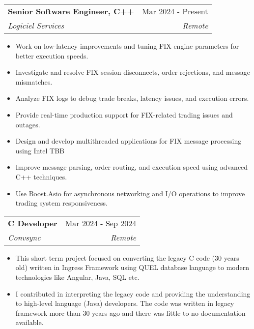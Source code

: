 \documentclass[letterpaper,11pt]{article}
\makeatletter
\newcommand{\resumeItem}[1]{
  \item\small{
    {#1 \vspace{-2pt}}
  }
}
\newcommand{\resumeSubheading}[4]{
  \vspace{-2pt}\item
    \begin{tabular*}{0.97\textwidth}[t]{l@{\extracolsep{\fill}}r}
      \textbf{#1} & #2 \\
      \textit{\small#3} & \textit{\small #4} \\
    \end{tabular*}\vspace{-7pt}
}
\newcommand{\resumeItemListStart}{\begin{itemize}}
\newcommand{\resumeItemListEnd}{\end{itemize}\vspace{-5pt}}
\makeatother
\begin{document}
    \resumeSubheading
      {Senior Software Engineer, C++}  {Mar 2024 - Present}
      {Logiciel Services}{Remote}
      \resumeItemListStart
        \resumeItem{Work on low-latency improvements and tuning FIX engine parameters for better execution speeds.}
        \resumeItem{Investigate and resolve FIX session disconnects, order rejections, and message mismatches.}
        \resumeItem{Analyze FIX logs to debug trade breaks, latency issues, and execution errors.}
        \resumeItem{Provide real-time production support for FIX-related trading issues and outages.}
        \resumeItem{Design and develop multithreaded applications for FIX message processing using Intel TBB}
        \resumeItem{Improve message parsing, order routing, and execution speed using advanced C++ techniques.}
        \resumeItem{Use Boost.Asio for asynchronous networking and I/O operations to improve trading system responsiveness.}
		\resumeItemListEnd
        \resumeSubheading
      {C Developer}  {Mar 2024 - Sep 2024}
      {Convsync}{Remote}
      \resumeItemListStart
        \resumeItem{This short term project focused on converting the legacy C code (30 years old) written in Ingress Framework using QUEL database language to modern technologies like Angular, Java, SQL etc.} \resumeItem{I contributed in interpreting the legacy code and providing the understanding to high-level language (Java) developers. The code was written in legacy framework more than 30 years ago and there was little to no documentation available.}
    \resumeItemListEnd

%        
\end{document}
